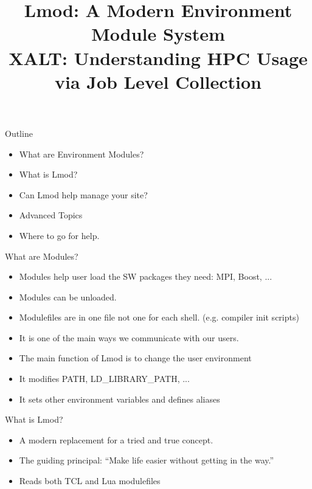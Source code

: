 \documentclass{beamer}
\begin{document}
\title[Lmod]{Lmod: A Modern Environment Module System\\
             XALT: Understanding HPC Usage via Job Level Collection}

\frame{\titlepage} 

\begin{frame}{Outline}
  \begin{itemize}
    \item What are Environment Modules?
    \item What is Lmod?
    \item Can Lmod help manage your site?
    \item Advanced Topics
    \item Where to go for help.
  \end{itemize}
\end{frame}

\begin{frame}{What are Modules?}
  \begin{itemize}
    \item Modules help user load the SW packages they need: MPI, Boost, ...
    \item Modules can be unloaded.
    \item Modulefiles are in one file not one for each
      shell. (e.g. compiler init scripts)
    \item It is one of the main ways we communicate with our users.
    \item The main function of Lmod is to change the user environment
    \item It modifies PATH, LD\_LIBRARY\_PATH, ...
    \item It sets other environment variables and defines aliases
  \end{itemize}
\end{frame}

\begin{frame}{What is Lmod?}
  \begin{itemize}
    \item A modern replacement for a tried and true concept.
    \item The guiding principal: ``Make life easier without getting in
      the way.''
    \item Reads both TCL and Lua modulefiles
  \end{itemize}
\end{frame}
\end{document}
